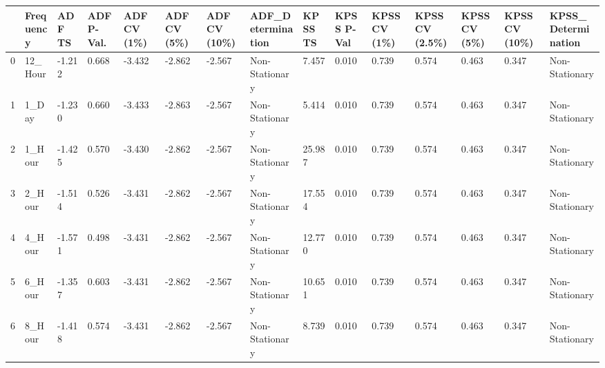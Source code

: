\begin{tabular}{lllllllllllllll}
\toprule
 & Frequency & ADF TS & ADF P-Val. & ADF CV (1\%) & ADF CV (5\%) & ADF CV (10\%) & ADF_Determination & KPSS TS & KPSS P-Val & KPSS CV (1\%) & KPSS CV (2.5\%) & KPSS CV (5\%) & KPSS CV (10\%) & KPSS_Determination \\
\midrule
0 & 12_Hour & -1.212 & 0.668 & -3.432 & -2.862 & -2.567 & Non-Stationary & 7.457 & 0.010 & 0.739 & 0.574 & 0.463 & 0.347 & Non-Stationary \\
1 & 1_Day & -1.230 & 0.660 & -3.433 & -2.863 & -2.567 & Non-Stationary & 5.414 & 0.010 & 0.739 & 0.574 & 0.463 & 0.347 & Non-Stationary \\
2 & 1_Hour & -1.425 & 0.570 & -3.430 & -2.862 & -2.567 & Non-Stationary & 25.987 & 0.010 & 0.739 & 0.574 & 0.463 & 0.347 & Non-Stationary \\
3 & 2_Hour & -1.514 & 0.526 & -3.431 & -2.862 & -2.567 & Non-Stationary & 17.554 & 0.010 & 0.739 & 0.574 & 0.463 & 0.347 & Non-Stationary \\
4 & 4_Hour & -1.571 & 0.498 & -3.431 & -2.862 & -2.567 & Non-Stationary & 12.770 & 0.010 & 0.739 & 0.574 & 0.463 & 0.347 & Non-Stationary \\
5 & 6_Hour & -1.357 & 0.603 & -3.431 & -2.862 & -2.567 & Non-Stationary & 10.651 & 0.010 & 0.739 & 0.574 & 0.463 & 0.347 & Non-Stationary \\
6 & 8_Hour & -1.418 & 0.574 & -3.431 & -2.862 & -2.567 & Non-Stationary & 8.739 & 0.010 & 0.739 & 0.574 & 0.463 & 0.347 & Non-Stationary \\
\bottomrule
\end{tabular}
